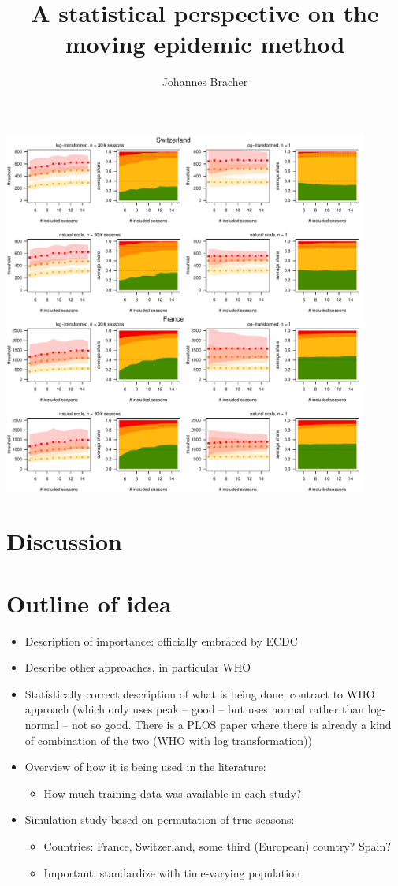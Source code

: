 \documentclass{article}
\begin{document}
\includegraphics[page=2, width=0.9\textwidth]{figure/plot_results.pdf}


\section{Discussion}
\label{sec:discussion}

\section*{Outline of idea}

\begin{itemize}
\item Description of importance: officially embraced by ECDC
\item Describe other approaches, in particular WHO
\item Statistically correct description of what is being done, contract to WHO approach (which only uses peak -- good -- but uses normal rather than log-normal -- not so good. There is a PLOS paper where there is already a kind of combination of the two (WHO with log transformation))
\item Overview of how it is being used in the literature:
\begin{itemize}
\item How much training data was available in each study?
\end{itemize}
\item Simulation study based on permutation of true seasons:
\begin{itemize}
\item Countries: France, Switzerland, some third (European) country? Spain?
\item Important: standardize with time-varying population
\end{itemize}
\end{itemize}

\title{A statistical perspective on the moving epidemic method }
\author{Johannes Bracher}
\maketitle





\end{document}

